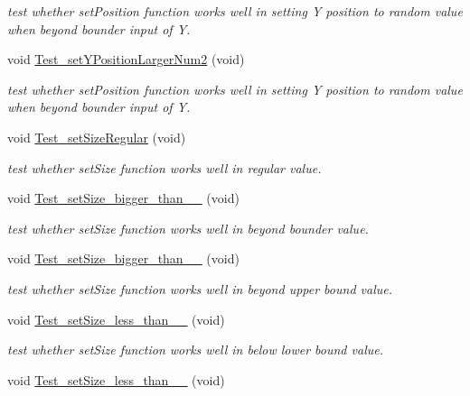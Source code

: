 \begin{DoxyCompactItemize}
\begin{DoxyCompactList}\small\item\em test whether set\-Position function works well in setting Y position to random value when beyond bounder input of Y. \end{DoxyCompactList}\item 
void \hyperlink{classObjectTests_a2db50cd40ae9c013e4dc8de85cd174f8}{Test\-\_\-set\-Y\-Position\-Larger\-Num2} (void)
\begin{DoxyCompactList}\small\item\em test whether set\-Position function works well in setting Y position to random value when beyond bounder input of Y. \end{DoxyCompactList}\item 
void \hyperlink{classObjectTests_a2c24cb7e640edfab1350c7fd6bae30ee}{Test\-\_\-set\-Size\-Regular} (void)
\begin{DoxyCompactList}\small\item\em test whether set\-Size function works well in regular value. \end{DoxyCompactList}\item 
void \hyperlink{classObjectTests_aea19fefb82d85e2354aa36e20001a1ee}{Test\-\_\-set\-Size\-\_\-bigger\-\_\-than\-\_\-\_} (void)
\begin{DoxyCompactList}\small\item\em test whether set\-Size function works well in beyond bounder value. \end{DoxyCompactList}\item 
void \hyperlink{classObjectTests_acb11b07a5ec45e71e5e659b3e7172fe3}{Test\-\_\-set\-Size\-\_\-bigger\-\_\-than\-\_\-\_} (void)
\begin{DoxyCompactList}\small\item\em test whether set\-Size function works well in beyond upper bound value. \end{DoxyCompactList}\item 
void \hyperlink{classObjectTests_a4447d749d95d2d1fe87ba82d30babc78}{Test\-\_\-set\-Size\-\_\-less\-\_\-than\-\_\-\_} (void)
\begin{DoxyCompactList}\small\item\em test whether set\-Size function works well in below lower bound value. \end{DoxyCompactList}\item 
void \hyperlink{classObjectTests_a17b80732faa07515ce308285c243220f}{Test\-\_\-set\-Size\-\_\-less\-\_\-than\-\_\-\_} (void)

\end{DoxyCompactItemize}
